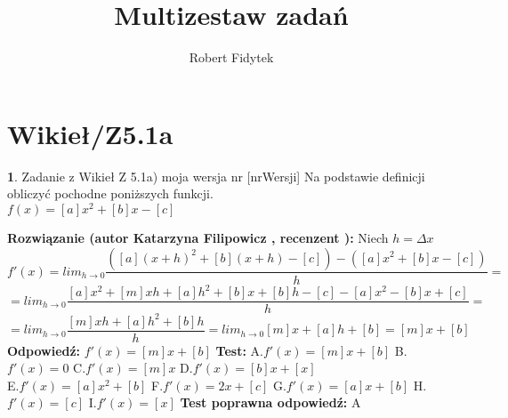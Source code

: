\documentclass[12pt, a4paper]{article}
\title{Multizestaw zadań}
\author{Robert Fidytek}
\date{}
\theoremstyle{definition} %
\newtheorem{zad}{}
\newcommand{\kategoria}[1]{\section{#1}} %
\newcommand{\zadStart}[1]{\begin{zad}#1\newline} %
\newcommand{\zadStop}{\end{zad}}   %
\newcommand{\rozwStart}[2]{\noindent \textbf{Rozwiązanie (autor #1 , recenzent #2): }\newline} %
\newcommand{\rozwStop}{\newline}                                            %
\newcommand{\odpStart}{\noindent \textbf{Odpowiedź:}\newline}    %
\newcommand{\odpStop}{\newline}                                             %
\newcommand{\testStart}{\noindent \textbf{Test:}\newline} %
\newcommand{\testStop}{\newline} %
\newcommand{\kluczStart}{\noindent \textbf{Test poprawna odpowiedź:}\newline} %
\newcommand{\kluczStop}{\newline} %
\begin{document}
\maketitle


\kategoria{Wikieł/Z5.1a}
\zadStart{Zadanie z Wikieł Z 5.1a) moja wersja nr [nrWersji]}
Na podstawie definicji obliczyć pochodne poniższych funkcji.\\
 $f(x)=[a]x^2+[b]x-[c]$
\zadStop
\rozwStart{Katarzyna Filipowicz}{}
Niech $h=\Delta x$
$$
f'(x)=lim_{h\rightarrow 0} \frac{([a](x+h)^2+[b](x+h)-[c])-([a]x^2+[b]x-[c])}{h}=
$$ $$
=lim_{h\rightarrow 0}\frac{[a]x^2+[m]xh+[a]h^2+[b]x+[b]h-[c]-[a]x^2-[b]x+[c]}{h}=
$$ $$
=lim_{h\rightarrow 0}\frac{[m]xh+[a]h^2+[b]h}{h}=lim_{h\rightarrow 0}[m]x+[a]h+[b]=[m]x+[b]
$$
\rozwStop
\odpStart
$f'(x)=[m]x+[b]$
\odpStop
\testStart
A.$f'(x)=[m]x+[b]$
B.$f'(x)=0$
C.$f'(x)=[m]x$
D.$f'(x)=[b]x+[x]$\\
E.$f'(x)=[a]x^2+[b]$
F.$f'(x)=2x+[c]$
G.$f'(x)=[a]x+[b]$
H.$f'(x)=[c]$
I.$f'(x)=[x]$
\testStop
\kluczStart
A
\kluczStop
\end{document}

